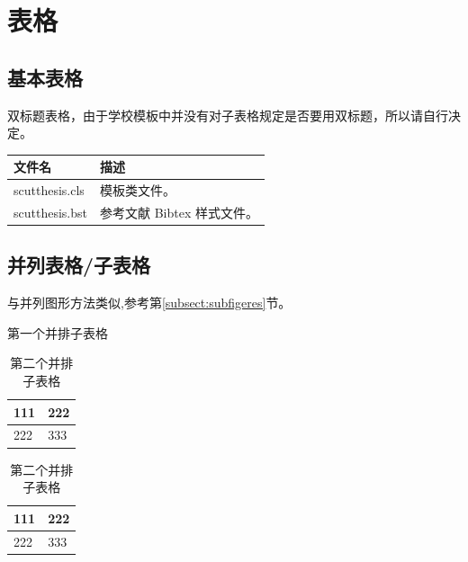 \section{表格}
\subsection{基本表格}
\label{subsect:basictable}
双标题表格，由于学校模板中并没有对子表格规定是否要用双标题，所以请自行决定。

\begin{table}[htb]
  \centering
  \begin{minipage}[t]{0.8\linewidth} %
  \label{tab:basic}
    \begin{tabular*}{\linewidth}{lp{10cm}}
      \toprule[1.5pt]
      {文件名} & {描述} \\\midrule[1pt]
      scutthesis.cls & 模板类文件。\\
      scutthesis.bst    & 参考文献 Bibtex 样式文件。\\
      \bottomrule[1.5pt]
    \end{tabular*}
  \end{minipage}
\end{table}


\subsection{并列表格/子表格}
与并列图形方法类似,参考第\ref{subsect:subfigeres}节。
\begin{table}%
\noindent\begin{minipage}{0.5\textwidth}
\centering
\caption{第一个并排子表格}
\label{tab:parallel1}
\begin{tabular}{p{2cm}p{2cm}}
\toprule[1.5pt]
111 & 222 \\\midrule[1pt]
222 & 333 \\\bottomrule[1.5pt]
\end{tabular}
\end{minipage}
\begin{minipage}{0.5\textwidth}
\centering
\caption{第二个并排子表格}
\label{tab:parallel2}
\begin{tabular}{p{2cm}p{2cm}}
\toprule[1.5pt]
111 & 222 \\\midrule[1pt]
222 & 333 \\\bottomrule[1.5pt]
\end{tabular}
\end{minipage}
\end{table}

